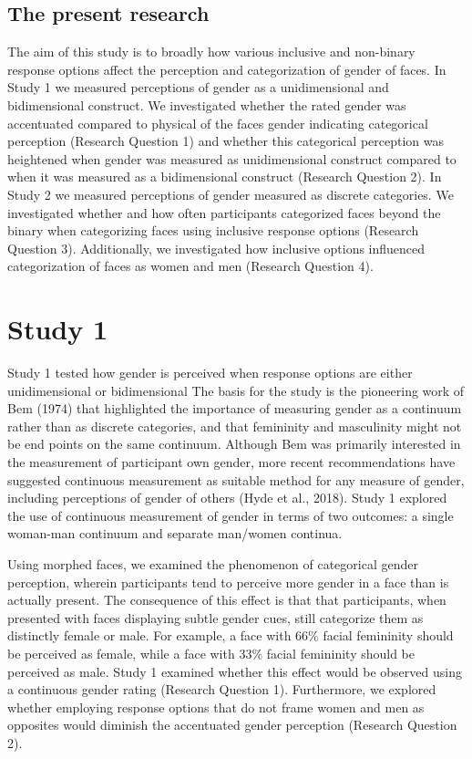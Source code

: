 \documentclass[
  man]{apa7}
\begin{document}
\hypertarget{the-present-research}{%
\subsection{The present research}\label{the-present-research}}

The aim of this study is to broadly how various inclusive and non-binary response options affect the perception and categorization of gender of faces. In Study 1 we measured perceptions of gender as a unidimensional and bidimensional construct. We investigated whether the rated gender was accentuated compared to physical of the faces gender indicating categorical perception (Research Question 1) and whether this categorical perception was heightened when gender was measured as unidimensional construct compared to when it was measured as a bidimensional construct (Research Question 2). In Study 2 we measured perceptions of gender measured as discrete categories. We investigated whether and how often participants categorized faces beyond the binary when categorizing faces using inclusive response options (Research Question 3). Additionally, we investigated how inclusive options influenced categorization of faces as women and men (Research Question 4).

\hypertarget{study-1}{%
\section{Study 1}\label{study-1}}

Study 1 tested how gender is perceived when response options are either unidimensional or bidimensional The basis for the study is the pioneering work of Bem (1974) that highlighted the importance of measuring gender as a continuum rather than as discrete categories, and that femininity and masculinity might not be end points on the same continuum. Although Bem was primarily interested in the measurement of participant own gender, more recent recommendations have suggested continuous measurement as suitable method for any measure of gender, including perceptions of gender of others (Hyde et al., 2018). Study 1 explored the use of continuous measurement of gender in terms of two outcomes: a single woman-man continuum and separate man/women continua.

Using morphed faces, we examined the phenomenon of categorical gender perception, wherein participants tend to perceive more gender in a face than is actually present. The consequence of this effect is that that participants, when presented with faces displaying subtle gender cues, still categorize them as distinctly female or male. For example, a face with 66\% facial femininity should be perceived as female, while a face with 33\% facial femininity should be perceived as male. Study 1 examined whether this effect would be observed using a continuous gender rating (Research Question 1). Furthermore, we explored whether employing response options that do not frame women and men as opposites would diminish the accentuated gender perception (Research Question 2).
\end{document}
